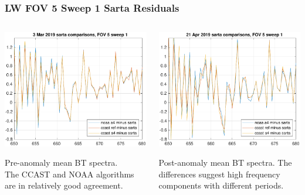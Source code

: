 \documentclass[10pt]{beamer}
\begin{document}
\begin{frame}
\frametitle{LW FOV 5 Sweep 1 Sarta Residuals}
\begin{columns}[t]
\begin{column}{0.5\textwidth}
  \begin{centering}
  \includegraphics[width=\textwidth]{figures/LW_pre_fail_sarta_fov5_sd1.pdf}
  \end{centering}\vspace{3mm}
  Pre-anomaly mean BT spectra.  \\The CCAST and NOAA algorithms are
  in relatively good agreement.

\end{column}
\begin{column}{0.5\textwidth}  
  \begin{centering}
  \includegraphics[width=\textwidth]{figures/LW_post_fail_sarta_fov5_sd1.pdf}
  \end{centering}\vspace{3mm}
  Post-anomaly mean BT spectra.  The differences suggest high
  frequency components with different periods.

\end{column}
\end{columns}
\end{frame}
\end{document}
